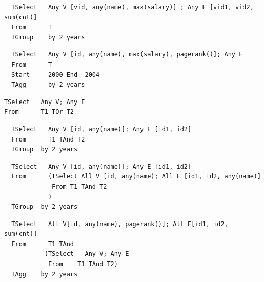 \begin{verbatim}
  TSelect   Any V [vid, any(name), max(salary)] ; Any E [vid1, vid2, sum(cnt)]
  From      T
  TGroup    by 2 years
\end{verbatim}

\begin{verbatim}
  TSelect   Any V [id, any(name), max(salary), pagerank()]; Any E   
  From      T
  Start     2000 End  2004
  TAgg      by 2 years
\end{verbatim}

\begin{verbatim}
TSelect   Any V; Any E
From      T1 TOr T2
\end{verbatim}

\begin{verbatim}
  TSelect   Any V [id, any(name)]; Any E [id1, id2]
  From      T1 TAnd T2
  TGroup  by 2 years
\end{verbatim}

\begin{verbatim}
  TSelect   Any V [id, any(name)]; Any E [id1, id2]
  From      (TSelect All V [id, any(name); All E [id1, id2, any(name)]
             From T1 TAnd T2
            )
  TGroup  by 2 years
\end{verbatim}

\begin{verbatim}
  TSelect   All V[id, any(name), pagerank()]; All E[id1, id2, sum(cnt)]
  From      T1 TAnd  
           (TSelect   Any V; Any E
            From    T1 TAnd T2)
  TAgg    by 2 years
\end{verbatim}
